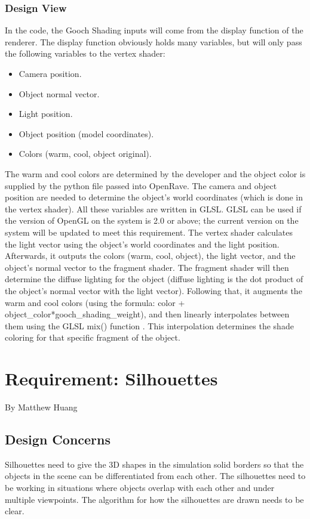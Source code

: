 \documentclass[10pt,journal,compsoc,draftclsnofoot]{IEEEtran}
\begin{document}
\begin{flushleft}
\subsubsection{Design View}
In the code, the Gooch Shading inputs will come from the display function of the renderer.
The display function obviously holds many variables, but will only pass the following variables to the vertex shader:
\begin{itemize}
\item Camera position.
\item Object normal vector.
\item Light position.
\item Object position (model coordinates).
\item Colors (warm, cool, object original).
\end{itemize}

The warm and cool colors are determined by the developer and the object color is supplied by the python file passed into OpenRave.
The camera and object position are needed to determine the object’s world coordinates (which is done in the vertex shader).
All these variables are written in GLSL.
GLSL can be used if the version of OpenGL on the system is 2.0 or above; the current version on the system will be updated to meet this requirement.
The vertex shader calculates the light vector using the object’s world coordinates and the light position. 
Afterwards, it outputs the colors (warm, cool, object), the light vector, and the object’s normal vector to the fragment shader.
The fragment shader will then determine the diffuse lighting for the object (diffuse lighting is the dot product of the object's normal vector with the light vector).
Following that, it augments the warm and cool colors (using the formula: color + object\_color*gooch\_shading\_weight), and then linearly interpolates between them using the GLSL mix() function \cite{glslmix}.
This interpolation determines the shade coloring for that specific fragment of the object.

\newpage

\section{Requirement: Silhouettes}
\large{By Matthew Huang}

\normalsize
\subsection{Design Concerns}
Silhouettes need to give the 3D shapes in the simulation solid borders so that the objects in the scene can be differentiated from each other.
The silhouettes need to be working in situations where objects overlap with each other and under multiple viewpoints. 
The algorithm for how the silhouettes are drawn needs to be clear.


\end{flushleft}
\end{document}
